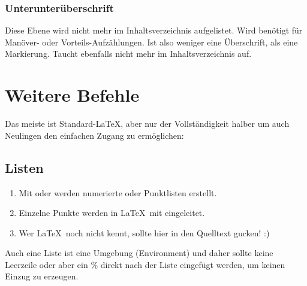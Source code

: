 \begin{multicols}{2}[        %
		]
	\subsubsection{Unterunterüberschrift}
	Diese Ebene wird nicht mehr im Inhaltsverzeichnis aufgelistet.
	Wird benötigt für Manöver- oder Vorteils-Aufzählungen. Ist also weniger eine Überschrift, als eine Markierung. Taucht ebenfalls nicht mehr im Inhaltsverzeichnis auf.

\section{Weitere Befehle}
Das meiste ist Standard-\LaTeX, aber nur der Vollständigkeit halber um auch Neulingen den einfachen Zugang zu ermöglichen:
\subsection{Listen}
\begin{enumerate}
	\item Mit  oder  werden numerierte oder Punktlisten erstellt.
	\item Einzelne Punkte werden in \LaTeX\ mit  eingeleitet.
	\item Wer \LaTeX\ noch nicht kennt, sollte hier in den Quelltext gucken! :)
\end{enumerate}
Auch eine Liste ist eine Umgebung (Environment) und daher sollte keine Leerzeile oder aber ein \% direkt nach der Liste eingefügt werden, um keinen Einzug zu erzeugen.




\end{multicols}
